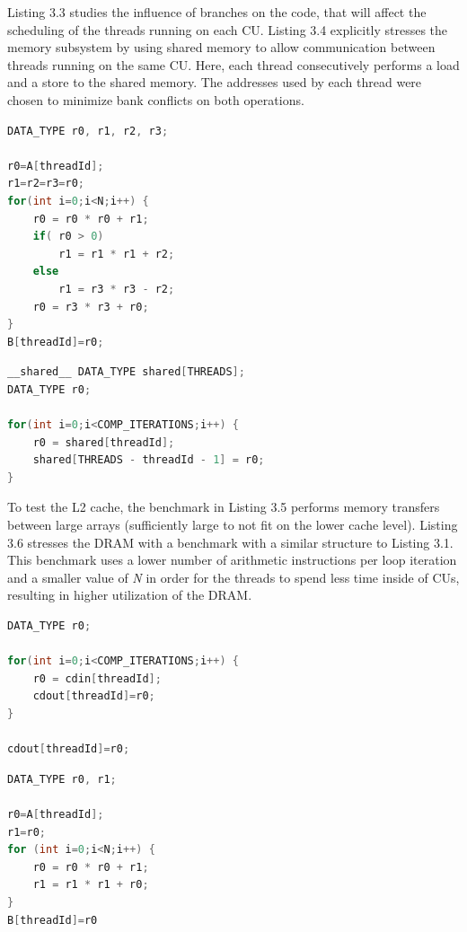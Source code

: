 Listing 3.3 studies the influence of branches on the code, that will affect the scheduling of the threads running on each CU. Listing 3.4 explicitly stresses the memory subsystem by using shared memory to allow communication between threads running on the same CU. Here, each thread consecutively performs a load and a store to the shared memory. The addresses used by each thread were chosen to minimize bank conflicts on both operations.


\noindent\begin{minipage}{.4\textwidth}
\begin{lstlisting}[language=C, caption={Branches Code}]
DATA_TYPE r0, r1, r2, r3;

r0=A[threadId]; 
r1=r2=r3=r0; 
for(int i=0;i<N;i++) {  
    r0 = r0 * r0 + r1;  
    if( r0 > 0)
        r1 = r1 * r1 + r2; 
    else 
        r1 = r3 * r3 - r2; 
    r0 = r3 * r3 + r0; 
} 
B[threadId]=r0;
\end{lstlisting}
\end{minipage}\hfill
\begin{minipage}{.55\textwidth}
\begin{lstlisting}[language=C, caption={Shared Memory Code}]
__shared__ DATA_TYPE shared[THREADS]; 
DATA_TYPE r0; 

for(int i=0;i<COMP_ITERATIONS;i++) {  
    r0 = shared[threadId];      
    shared[THREADS - threadId - 1] = r0;
}
\end{lstlisting}
\end{minipage}

To test the L2 cache, the benchmark in Listing 3.5 performs memory transfers between large arrays (sufficiently large to not fit on the lower cache level). Listing 3.6 stresses the DRAM with a benchmark with a similar structure to Listing 3.1. This benchmark uses a lower number of arithmetic instructions per loop iteration and a smaller value of \textit{N} in order for the threads to spend less time inside of CUs, resulting in higher utilization of the DRAM.

\noindent\begin{minipage}{.55\textwidth}
\begin{lstlisting}[language=C, caption={L2 Cache Code}]
DATA_TYPE r0;

for(int i=0;i<COMP_ITERATIONS;i++) {      
    r0 = cdin[threadId];      
    cdout[threadId]=r0;
} 

cdout[threadId]=r0;
\end{lstlisting}
\end{minipage}\hfill
\begin{minipage}{.4\textwidth}
\begin{lstlisting}[language=C, caption={DRAM Code}]
DATA_TYPE r0, r1;

r0=A[threadId]; 
r1=r0; 
for (int i=0;i<N;i++) {  
    r0 = r0 * r0 + r1;  
    r1 = r1 * r1 + r0; 
} 
B[threadId]=r0
\end{lstlisting}
\end{minipage}


